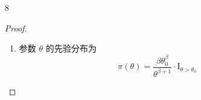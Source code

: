 \documentclass[normal,founder,mtpro2,cn]{elegantnote}
\begin{document}
\begin{enumerate}
\begin{proof}
            则 $x_{1},x_{2},\ldots,x_{n}$ 和 $\theta$ 的联合分布为
            \begin{equation*}
                h\left(x_{1},x_{2},\ldots,x_{n},\theta\right)=\frac{\lambda^{\alpha}}{\Gamma(\alpha)\cdot\prod_{i=1}^{n}x_{i}}\theta^{n+\alpha-1}\exp\left\{-\left[\lambda-\sum{i=1}^{n}\ln x_{i}\right]\theta\right\}\cdot\mathrm{I}_{\theta>0}
            \end{equation*}

            可得样本 $x_{1},x_{2},\ldots,x_{n}$ 的边际分布为
            \begin{equation*}
                \begin{aligned}
                    m(x_{1},x_{2},\ldots,x_{n})= & \frac{\lambda^{\alpha}}{\Gamma(\alpha)\cdot\prod_{i=1}^{n}x_{i}}\int_{0}^{+\infty}\theta^{n+\alpha-1}\exp\left\{-\left[\lambda-\sum_{i=1}^{n}\ln x_{i}\right]\theta\right\}\,\mathrm{d}\theta \\
                    =                            & \frac{\lambda^{\alpha}}{\Gamma(\alpha)\cdot\prod_{i=1}^{n}x_{i}}\cdot\frac{\Gamma(n+\alpha)}{\left[\lambda-\sum_{i=1}^{n}\ln x_{i}\right]^{n+\alpha}},
                \end{aligned}
            \end{equation*}

            因此 $\lambda$ 的后验分布为
            \begin{equation*}
                \pi\left(\theta\mid x_{1},x_{2},\ldots,x_{n}\right)=\frac{\left[\lambda-\sum_{i=1}^{n}\ln x_{i}\right]^{n+\alpha}}{\Gamma(n+\alpha)}\theta^{n+\alpha-1}\exp\left\{-\left[\lambda-\sum_{i=1}^{n}\ln x_{i}\right]\theta\right\}
            \end{equation*}

            后验分布仍为伽玛分布 $Ga\left(n+\alpha,\lambda-\sum_{i=1}^{n}\ln x_{i}\right)$，所以 $\theta$ 的后验期望估计为
            \begin{equation*}
                \hat{\theta}_{B}=\frac{n+\alpha}{\lambda-\sum_{i=1}^{n}\ln x_{i}}
            \end{equation*}
        \end{proof}
    \item[8]
        \begin{proof}
            \begin{enumerate}
                \item
                      参数 $\theta$ 的先验分布为
                      \begin{equation*}
                          \pi(\theta)=\frac{\beta\theta_{0}^{\beta}}{\theta^{\beta+1}}\cdot\mathrm{I}_{\theta>\theta_{0}}
                      \end{equation*}


\end{enumerate}
\end{proof}
\end{enumerate}
\end{document}
